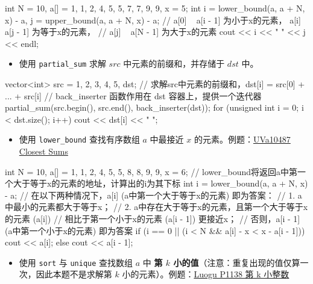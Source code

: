 \begin{codeline}
int N = 10, a[] = {1, 1, 2, 4, 5, 5, 7, 7, 9, 9}, x = 5;
int i = lower_bound(a, a + N, x) - a, j = upper_bound(a, a + N, x) - a;
// a[0] ~ a[i - 1] 为小于x的元素， a[i] ~ a[j - 1] 为等于x的元素，
// a[j] ~ a[N - 1] 为大于x的元素
cout << i << " " << j << endl;
\end{codeline}


\begin{itemize}
\tightlist
\item
  使用 \texttt{partial\_sum} 求解 \(src\) 中元素的前缀和，并存储于 \(dst\) 中。
\end{itemize}


\begin{codeline}
vector<int> src = {1, 2, 3, 4, 5}, dst;
// 求解src中元素的前缀和，dst[i] = src[0] + ... + src[i]
// back_inserter 函数作用在 dst 容器上，提供一个迭代器
partial_sum(src.begin(), src.end(), back_inserter(dst));
for (unsigned int i = 0; i < dst.size(); i++) cout << dst[i] << " ";
\end{codeline}


\begin{itemize}
\tightlist
\item
  使用 \texttt{lower\_bound} 查找有序数组 \(a\) 中最接近 \(x\) 的元素。例题：\href{https://onlinejudge.org/index.php?option=com_onlinejudge&Itemid=8&category=16&page=show_problem&problem=1428}{UVa10487 Closest Sums}
\end{itemize}


\begin{codeline}
int N = 10, a[] = {1, 1, 2, 4, 5, 5, 8, 8, 9, 9}, x = 6;
// lower_bound将返回a中第一个大于等于x的元素的地址，计算出的i为其下标
int i = lower_bound(a, a + N, x) - a;
// 在以下两种情况下，a[i] (a中第一个大于等于x的元素) 即为答案：
// 1. a中最小的元素都大于等于x；
// 2. a中存在大于等于x的元素，且第一个大于等于x的元素 (a[i])
// 相比于第一个小于x的元素 (a[i - 1]) 更接近x；
// 否则，a[i - 1] (a中第一个小于x的元素) 即为答案
if (i == 0 || (i < N && a[i] - x < x - a[i - 1]))
    cout << a[i];
else
    cout << a[i - 1];
\end{codeline}


\begin{itemize}
\tightlist
\item
  使用 \texttt{sort} 与 \texttt{unique} 查找数组 \(a\) 中 \textbf{第 \(k\) 小的值}（注意：重复出现的值仅算一次，因此本题不是求解第 \(k\) 小的元素）。例题：\href{https://www.luogu.com.cn/problem/P1138}{Luogu P1138 第 k 小整数}
\end{itemize}


